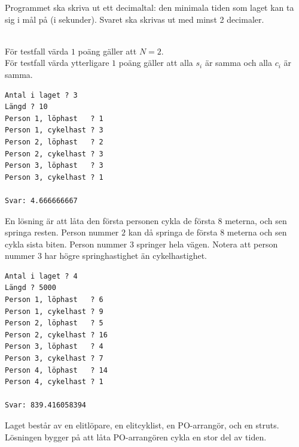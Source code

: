 Programmet ska skriva ut ett decimaltal: den minimala tiden som laget kan ta sig i mål på (i sekunder).
Svaret ska skrivas ut med minst 2 decimaler.

\\
För testfall värda $1$ poäng gäller att $N=2$. \\
För testfall värda ytterligare $1$ poäng gäller att alla $s_i$ är samma och alla $c_i$ är samma.\\

\begin{multicols}{2}
\begin{verbatim}
Antal i laget ? 3
Längd ? 10
Person 1, löphast   ? 1
Person 1, cykelhast ? 3
Person 2, löphast   ? 2
Person 2, cykelhast ? 3
Person 3, löphast   ? 3
Person 3, cykelhast ? 1

Svar: 4.666666667
\end{verbatim}
 En lösning är att låta den första personen cykla de första $8$ meterna, och sen springa resten. Person nummer $2$
kan då springa de första $8$ meterna och sen cykla sista biten. Person nummer $3$ springer hela vägen. Notera att person nummer $3$ har
högre springhastighet än cykelhastighet.
\vfill\columnbreak
{}
\begin{verbatim}
Antal i laget ? 4
Längd ? 5000
Person 1, löphast   ? 6
Person 1, cykelhast ? 9
Person 2, löphast   ? 5
Person 2, cykelhast ? 16
Person 3, löphast   ? 4
Person 3, cykelhast ? 7
Person 4, löphast   ? 14
Person 4, cykelhast ? 1

Svar: 839.416058394
\end{verbatim}
 Laget består av en elitlöpare, en elitcyklist, en PO-arrangör, och en struts. Lösningen bygger på att låta PO-arrangören
cykla en stor del av tiden.
\vfill
\end{multicols}




